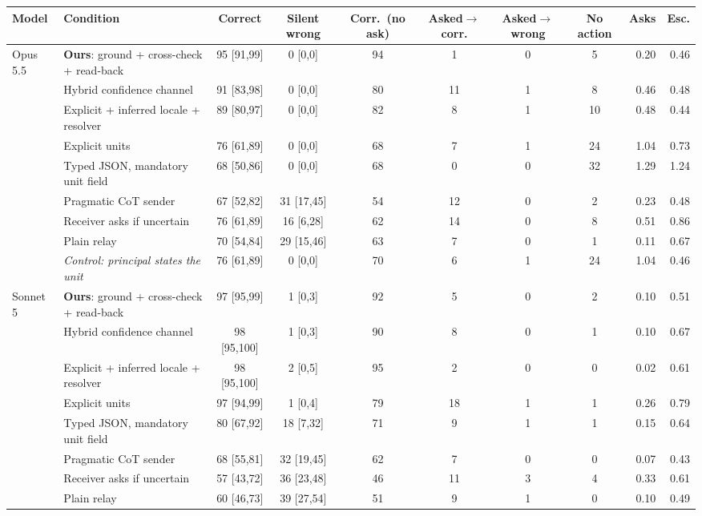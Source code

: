 \begin{tabular}{llcccccc rr}
\toprule
Model & Condition & Correct & Silent wrong & Corr.\ (no ask) & Asked$\to$corr. & Asked$\to$wrong & No action & Asks & Esc. \\
\midrule
\multirow{9}{*}{Opus 5.5} & \textbf{Ours}: ground + cross-check + read-back & 95 [91,99] & 0 [0,0] & 94 & 1 & 0 & 5 & 0.20 & 0.46 \\
 & Hybrid confidence channel & 91 [83,98] & 0 [0,0] & 80 & 11 & 1 & 8 & 0.46 & 0.48 \\
 & Explicit + inferred locale + resolver & 89 [80,97] & 0 [0,0] & 82 & 8 & 1 & 10 & 0.48 & 0.44 \\
 & Explicit units \citep{miao2026capri} & 76 [61,89] & 0 [0,0] & 68 & 7 & 1 & 24 & 1.04 & 0.73 \\
 & Typed JSON, mandatory unit field & 68 [50,86] & 0 [0,0] & 68 & 0 & 0 & 32 & 1.29 & 1.24 \\
 & Pragmatic CoT sender \citep{miao2026capri} & 67 [52,82] & 31 [17,45] & 54 & 12 & 0 & 2 & 0.23 & 0.48 \\
 & Receiver asks if uncertain \citep{matsnev2026uncertainty} & 76 [61,89] & 16 [6,28] & 62 & 14 & 0 & 8 & 0.51 & 0.86 \\
 & Plain relay & 70 [54,84] & 29 [15,46] & 63 & 7 & 0 & 1 & 0.11 & 0.67 \\
 & \textit{Control: principal states the unit} & 76 [61,89] & 0 [0,0] & 70 & 6 & 1 & 24 & 1.04 & 0.46 \\
\midrule
\multirow{9}{*}{Sonnet 5} & \textbf{Ours}: ground + cross-check + read-back & 97 [95,99] & 1 [0,3] & 92 & 5 & 0 & 2 & 0.10 & 0.51 \\
 & Hybrid confidence channel & 98 [95,100] & 1 [0,3] & 90 & 8 & 0 & 1 & 0.10 & 0.67 \\
 & Explicit + inferred locale + resolver & 98 [95,100] & 2 [0,5] & 95 & 2 & 0 & 0 & 0.02 & 0.61 \\
 & Explicit units \citep{miao2026capri} & 97 [94,99] & 1 [0,4] & 79 & 18 & 1 & 1 & 0.26 & 0.79 \\
 & Typed JSON, mandatory unit field & 80 [67,92] & 18 [7,32] & 71 & 9 & 1 & 1 & 0.15 & 0.64 \\
 & Pragmatic CoT sender \citep{miao2026capri} & 68 [55,81] & 32 [19,45] & 62 & 7 & 0 & 0 & 0.07 & 0.43 \\
 & Receiver asks if uncertain \citep{matsnev2026uncertainty} & 57 [43,72] & 36 [23,48] & 46 & 11 & 3 & 4 & 0.33 & 0.61 \\
 & Plain relay & 60 [46,73] & 39 [27,54] & 51 & 9 & 1 & 0 & 0.10 & 0.49 \\

\end{tabular}
